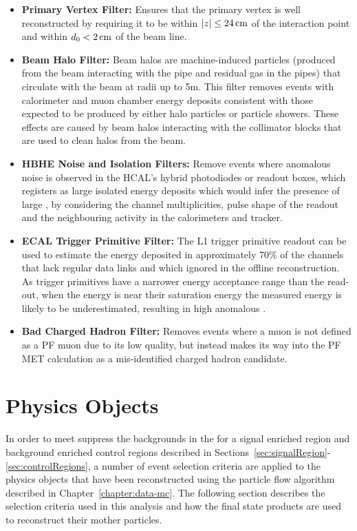 \begin{itemize}
\item \textbf{Primary Vertex Filter:} Ensures that the primary vertex is well reconstructed by requiring it to be within $|z| \leq 24\,\text{cm}$ of the interaction point and within $d_{0} < 2\,\text{cm}$ of the beam line.
\item \textbf{Beam Halo Filter:} Beam halos are machine-induced particles (\ie produced from the beam interacting with the pipe and residual gas in the pipes) that circulate with the beam at radii up to 5m. This filter removes events with calorimeter and muon chamber energy deposits consistent with those expected to be produced by either halo particles or particle showers.
These effects are caused by beam halos interacting with the collimator blocks that are used to clean halos from the beam.
\item \textbf{HBHE Noise and Isolation Filters:} Remove events where anomalous noise is observed in the HCAL's hybrid photodiodes or readout boxes, which registers as large isolated energy deposits which would infer the presence of large \MET, by considering the channel multiplicities, pulse shape of the readout and the neighbouring activity in the calorimeters and tracker.
\item \textbf{ECAL Trigger Primitive Filter:} The L1 trigger primitive readout can be used to estimate the energy deposited in approximately 70\% of the channels that lack regular data links and which ignored in the offline reconstruction. As trigger primitives have a narrower energy acceptance range than the read-out, when the energy is near their saturation energy the measured energy is likely to be underestimated, resulting in high anomalous \MET. 
\item \textbf{Bad Charged Hadron Filter:} Removes events where a muon is not defined as a PF muon due to its low quality, but instead makes its way into the PF MET calculation as a mis-identified charged hadron candidate.
\end{itemize}

\section{Physics Objects}\label{sec:physicsObjects}
In order to meet suppress the backgrounds in the for a signal enriched region and background enriched control regions described in Sections~\ref{sec:signalRegion}-\ref{sec:controlRegions}, a number of event selection criteria are applied to the physics objects that have been reconstructed using the particle flow algorithm described in Chapter~\ref{chapter:data-mc}.
The following section describes the selection criteria used in this analysis and how the final state products are used to reconstruct their mother particles.


